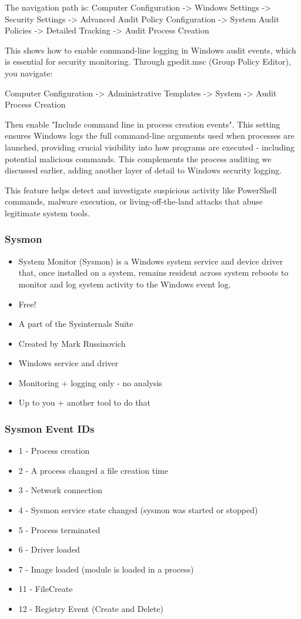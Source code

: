 The navigation path is:
Computer Configuration -> Windows Settings -> Security Settings -> Advanced Audit Policy Configuration -> System Audit Policies -> Detailed Tracking -> Audit Process Creation

This shows how to enable command-line logging in Windows audit events, which is essential for security monitoring. Through gpedit.msc (Group Policy Editor), you navigate:

Computer Configuration -> Administrative Templates -> System -> Audit Process Creation

Then enable "Include command line in process creation events". This setting ensures Windows logs the full command-line arguments used when processes are launched, providing crucial visibility into how programs are executed - including potential malicious commands. This complements the process auditing we discussed earlier, adding another layer of detail to Windows security logging.

This feature helps detect and investigate suspicious activity like PowerShell commands, malware execution, or living-off-the-land attacks that abuse legitimate system tools.

\subsubsection{Sysmon}
\begin{itemize}
  \item System Monitor (Sysmon) is a Windows system service and device driver that, once installed on a system, remains resident across system reboots to monitor and log system activity to the Windows event log.
  \item Free!
  \item A part of the Sysinternals Suite
  \item Created by Mark Russinovich
  \item Windows service and driver
  \item Monitoring + logging only - no analysis
  \item Up to you + another tool to do that
\end{itemize}

\subsubsection*{Sysmon Event IDs}
\begin{itemize}
  \item 1 - Process creation
  \item 2 - A process changed a file creation time
  \item 3 - Network connection
  \item 4 - Sysmon service state changed (sysmon was started or stopped)
  \item 5 - Process terminated
  \item 6 - Driver loaded
  \item 7 - Image loaded (module is loaded in a process)
  \item 11 - FileCreate
  \item 12 - Registry Event (Create and Delete)
\end{itemize}

